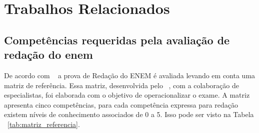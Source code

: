 \chapter{Trabalhos Relacionados}\label{trab_rela}


\section{Competências requeridas pela avaliação de redação do enem}

De acordo com ~\cite{silvio_taynan:2017} a prova de Redação do ENEM é avaliada levando em conta uma matriz de referência. Essa matriz, desenvolvida pelo ~\cite{edital_enem:2016}, com a colaboração de especialistas, foi elaborada com o objetivo de operacionalizar o exame. A matriz apresenta cinco competências, para cada competência expressa para redação existem níveis de conhecimento associados de 0 a 5. Isso pode ser visto na Tabela ~\ref{tab:matriz_referencia}.

